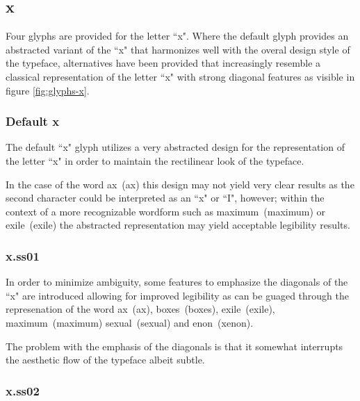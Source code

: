 \subsection{x}
Four glyphs are provided for the letter ``x". Where the default glyph provides
an abstracted variant of the ``x" that harmonizes well with the overal design
style of the typeface, alternatives have been provided that increasingly
resemble a classical representation of the letter ``x" with strong diagonal
features as visible in figure \ref{fig:glyphs-x}.


\subsubsection{Default {\ssdefault x}}
The default ``x" glyph utilizes a very abstracted design for the representation
of the letter ``x" in order to maintain the rectilinear look of the typeface.

In the case of the word \mbox{{\ssdefault ax} (ax)} this design may not yield
very clear results as the second character could be interpreted as an ``x" or
``I", however; within the context of a more recognizable wordform such as
\mbox{{\ssdefault maximum} (maximum)} or
\mbox{{\ssdefault exile} (exile)} the abstracted representation may yield
acceptable legibility results.


\subsubsection{{\ssone x}.ss01}

In order to minimize ambiguity, some features to emphasize the diagonals of the
``x" are introduced allowing for improved legibility as can be guaged through
the represenation of the word
\mbox{{\ssdefault a{\ssone x}} (ax)},
\mbox{{\ssdefault bo{\ssone x}es} (boxes)},
\mbox{{\ssdefault e{\ssone x}ile} (exile)},
\mbox{{\ssdefault ma{\ssone x}imum} (maximum)}
\mbox{{\ssdefault se{\ssone x}ual} (sexual)} and
\mbox{{enon} (xenon)}.

The problem with the emphasis of the diagonals is that it somewhat interrupts
the aesthetic flow of the typeface albeit subtle.

\subsubsection{{\sstwo x}.ss02}

